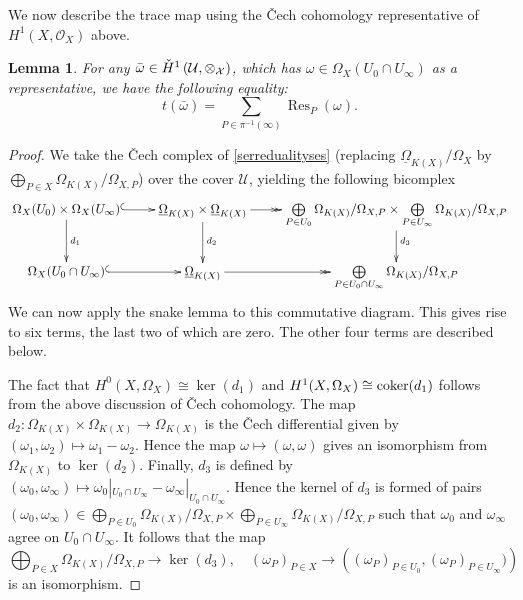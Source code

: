 \documentclass[draft, 11pt]{article} %
\theoremstyle{plain}
\newtheorem{lem}[defn]{Lemma}
\theoremstyle{remark}
\newcommand{\ra}{\rightarrow}
\newcommand{\cU}{{\mathcal U}}
\newcommand{\cech}{\v{C}ech }
\newcommand{\hone}{H^1(X,\mathcal{O}_X)}
\DeclareMathOperator{\res}{Res}
\begin{document}
We now describe the trace map using the \cech cohomology representative of $\hone$ above.
\begin{lem}\label{tracemaplemma}
For any $\bar \omega \in \check{H}^1\left (\cal U, \Omega_X\right )$, which has $\omega \in \Omega_X(U_0 \cap U_\infty)$ as a representative, we have the following equality:
\[
t(\bar \omega) = \sum_{P \in \pi^{-1}(\infty)}\res_P(\omega).
\]
\end{lem}
\begin{proof}
We take the \cech complex of \eqref{serredualityses} (replacing $\underline{\Omega}_{K(X)}/\Omega_X$ by $\bigoplus_{P \in X}\Omega_{K(X)}/\Omega_{X,P}$) over the cover $\cU$, yielding the following bicomplex
\begin{equation}\label{dualitydiagram2}
\xymatrix{\Omega_X(U_0)\times\Omega_X(U_\infty) \ar@{^{(}->}[r] \ar[d]^{d_1} & \underline{\Omega}_{K(X)} \times \underline{\Omega}_{K(X)} \ar[d]^{d_2} \ar@{->>}[r] & \bigoplus \limits_{P \in U_0} \Omega_{K(X)}/\Omega_{X,P} \times \bigoplus \limits_{P \in U_\infty} \Omega_{K(X)}/\Omega_{X,P} \ar[d]^{d_3} \\
\Omega_X(U_0 \cap U_\infty) \ar@{^{(}->}[r]  & \underline{\Omega}_{K(X)} \ar@{->>}[r] & \bigoplus \limits_{P\in U_0 \cap U_\infty} \Omega_{K(X)}/\Omega_{X,P} }
\end{equation}
We can now apply the snake lemma to this commutative diagram.
This gives rise to six terms, the last two of which are zero.
The other four terms are described below.

The fact that $H^0(X,\Omega_X) \cong \ker(d_1)$ and $H^1(X,\Omega_X) \cong {\rm coker}(d_1)$ follows from the above discussion of \cech cohomology.
The map $d_2\colon \Omega_{K(X)} \times \Omega_{K(X)} \ra \Omega_{K(X)}$ is the \cech differential given by $(\omega_1,\omega_2) \mapsto \omega_1 - \omega_2$.
Hence the map $\omega \mapsto (\omega, \omega)$ gives an isomorphism from $\Omega_{K(X)}$ to $\ker(d_2)$.
Finally, $d_3$ is defined by $(\omega_0, \omega_\infty) \mapsto \omega_0|_{U_0 \cap U_\infty} - \omega_\infty|_{U_0 \cap U_\infty}$.
Hence the kernel of $d_3$ is formed of pairs $(\omega_0, \omega_\infty) \in \bigoplus_{P \in U_0} \Omega_{K(X)}/\Omega_{X,P} \times \bigoplus_{P \in  U_\infty} \Omega_{K(X)}/\Omega_{X,P}$ such that $\omega_0$ and $\omega_\infty$ agree on $U_0 \cap U_\infty$.
It follows that the map 
\[
\bigoplus_{P \in X} \Omega_{K(X)}/\Omega_{X,P}\ra\ker(d_3), \quad  (\omega_P)_{P \in X} \to \left( (\omega_P)_{ P \in U_0}, (\omega_P)_{P \in U_\infty}) \right)
\]
is an isomorphism.


\end{proof}
\end{document}
